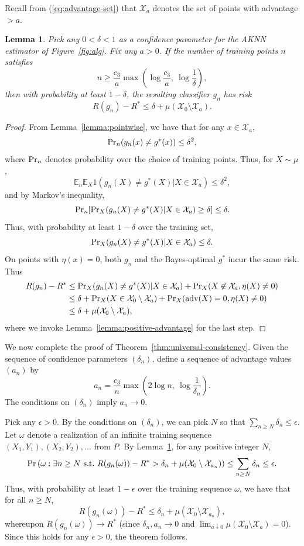 \documentclass{article}
\def\pr{{\rm Pr}}
\def\E{{\mathbb E}}
\def\X{{\mathcal X}}
\def\adv{{\rm adv}}
\newtheorem{lemma}[theorem]{Lemma}
\begin{document}
Recall from (\ref{eq:advantage-set}) that $\X_a$ denotes the set of points with advantage $> a$.
\begin{lemma}
Pick any $0 < \delta < 1$ as a confidence parameter for the AKNN estimator of Figure~\ref{fig:alg}. Fix any $a > 0$. If the number of training points $n$ satisfies
$$ n \geq \frac{c_3}{a} \max\left(\log \frac{c_3}{a}, \ \log \frac{1}{\delta} \right), $$
then with probability at least $1-\delta$, the resulting classifier $g_n$ has risk
$$ R(g_n) - R^* \leq \delta + \mu(\X_0 \setminus \X_a) .$$
\label{lemma:advantage-set-convergence}
\end{lemma}
\begin{proof}
From Lemma~\ref{lemma:pointwise}, we have that for any $x \in \X_a$, 
$$ \pr_n(g_n(x) \neq g^*(x)) \leq \delta^2 ,$$
where $\pr_n$ denotes probability over the choice of training points. Thus, for $X \sim \mu$,
$$ \E_n \E_X 1(g_n(X) \neq g^*(X) | X \in \X_a) \leq \delta^2 ,$$
and by Markov's inequality,
$$ \pr_n [\pr_X (g_n(X) \neq g^*(X) |  X \in \X_a) \geq \delta] \leq \delta.$$
Thus, with probability at least $1-\delta$ over the training set,
$$\pr_X (g_n(X) \neq g^*(X) |  X \in \X_a) \leq \delta .$$
On points with $\eta(x) = 0$, both $g_n$ and the Bayes-optimal $g^*$ incur the same risk. Thus
\begin{align*}
R(g_n) - R^*
&\leq \pr_X(g_n(X) \neq g^*(X) | X \in \X_a) + \pr_X(X \not\in \X_a, \eta(X) \neq 0) \\ 
&\leq \delta + \pr_X(X \in \X_0 \setminus \X_a) + \pr_X(\adv(X) = 0, \eta(X) \neq 0) \\ 
&\leq \delta + \mu(\X_0 \setminus \X_a),
\end{align*}
where we invoke Lemma~\ref{lemma:positive-advantage} for the last step.
\end{proof}

We now complete the proof of Theorem~\ref{thm:universal-consistency}. Given the sequence of confidence parameters $(\delta_n)$, define a sequence of advantage values $(a_n)$ by
$$ a_n = \frac{c_3}{n} \max \left( 2 \log n, \ \log \frac{1}{\delta_n} \right) .$$
The conditions on $(\delta_n)$ imply $a_n \rightarrow 0$.

Pick any $\epsilon > 0$. By the conditions on $(\delta_n)$, we can pick $N$ so that $\sum_{n \geq N} \delta_n \leq \epsilon$. Let $\omega$ denote a realization of an infinite training sequence $(X_1, Y_1), (X_2, Y_2), \ldots$ from $P$. By Lemma~\ref{lemma:advantage-set-convergence}, for any positive integer $N$,
$$ \pr \left(\omega: \exists n \geq N \mbox{\ s.t.\ } R(g_n(\omega)) - R^* > \delta_n + \mu(\X_0 \setminus \X_{a_n}) \right) \leq \sum_{n \geq N} \delta_n \leq \epsilon.$$
Thus, with probability at least $1-\epsilon$ over the training sequence $\omega$, we have that for all $n \geq N$,
$$ R(g_n(\omega)) - R^* \leq \delta_n + \mu(\X_0 \setminus \X_{a_n}) ,$$
whereupon $R(g_n(\omega)) \rightarrow R^*$ (since $\delta_n, a_n \rightarrow 0$ and $\lim_{a \downarrow 0} \mu(\X_0 \setminus \X_a) = 0$). Since this holds for any $\epsilon  >0$, the theorem follows.
\end{document}
